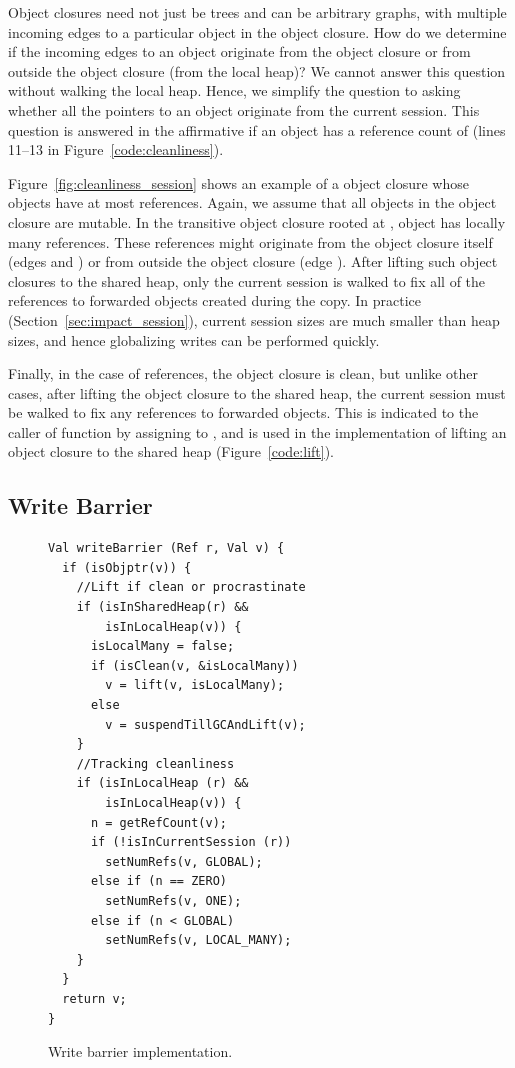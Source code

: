Object closures need not just be trees and can be arbitrary graphs, with
multiple incoming edges to a particular object in the object closure. How do we
determine if the incoming edges to an object originate from the object closure
or from outside the object closure (from the local heap)? We cannot answer this
question without walking the local heap. Hence, we simplify the question to
asking whether all the pointers to an object originate from the current
session. This question is answered in the affirmative if an object has a
reference count of  (lines 11--13 in
Figure~\ref{code:cleanliness}).

Figure~\ref{fig:cleanliness_session} shows an example of a object closure whose
objects have at most  references. Again, we assume that all
objects in the object closure are mutable. In the transitive object closure
rooted at , object  has locally many references. These references
might originate from the object closure itself (edges 
and ) or from outside the object closure (edge ). After lifting such object closures to the shared heap, only
the current session is walked to fix all of the references to forwarded objects
created during the copy. In practice (Section~\ref{sec:impact_session}),
current session sizes are much smaller than heap sizes, and hence globalizing
writes can be performed quickly.

Finally, in the case of  references, the object closure is
clean, but unlike other cases, after lifting the object closure to the shared
heap, the current session must be walked to fix any references to forwarded
objects. This is indicated to the caller of  function by assigning
 to , and is used in the implementation of lifting an
object closure to the shared heap (Figure~\ref{code:lift}).

\subsection{Write Barrier}
\label{sec:write_barrier}

\begin{figure}[t]
\begin{lstlisting}
Val writeBarrier (Ref r, Val v) {
  if (isObjptr(v)) {
    //Lift if clean or procrastinate
    if (isInSharedHeap(r) &&
        isInLocalHeap(v)) {
      isLocalMany = false;
      if (isClean(v, &isLocalMany))
        v = lift(v, isLocalMany);
      else
        v = suspendTillGCAndLift(v);
    }
    //Tracking cleanliness
    if (isInLocalHeap (r) &&
        isInLocalHeap(v)) {
      n = getRefCount(v);
      if (!isInCurrentSession (r))
        setNumRefs(v, GLOBAL);
      else if (n == ZERO)
        setNumRefs(v, ONE);
      else if (n < GLOBAL)
        setNumRefs(v, LOCAL_MANY);
    }
  }
  return v;
}
\end{lstlisting}
\caption{Write barrier implementation.}
\label{code:writeBarrier}
\end{figure}

